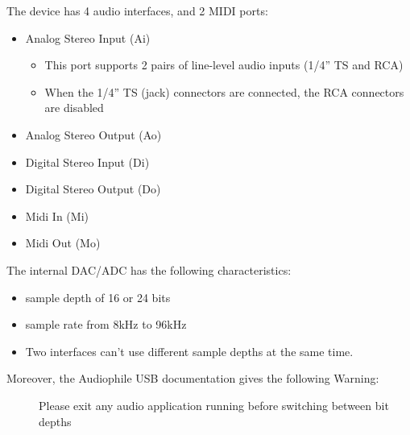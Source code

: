 \documentclass[a4paper,8pt,english]{sphinxmanual}
\begin{document}
The device has 4 audio interfaces, and 2 MIDI ports:
\begin{itemize}
\item {} 
Analog Stereo Input (Ai)
\begin{itemize}
\item {} 
This port supports 2 pairs of line-level audio inputs (1/4'' TS and RCA)

\item {} 
When the 1/4'' TS (jack) connectors are connected, the RCA connectors
are disabled

\end{itemize}

\item {} 
Analog Stereo Output (Ao)

\item {} 
Digital Stereo Input (Di)

\item {} 
Digital Stereo Output (Do)

\item {} 
Midi In (Mi)

\item {} 
Midi Out (Mo)

\end{itemize}

The internal DAC/ADC has the following characteristics:
\begin{itemize}
\item {} 
sample depth of 16 or 24 bits

\item {} 
sample rate from 8kHz to 96kHz

\item {} 
Two interfaces can't use different sample depths at the same time.

\end{itemize}
\begin{description}
\item[{Moreover, the Audiophile USB documentation gives the following Warning:}] \leavevmode
Please exit any audio application running before switching between bit depths

\end{description}
\end{document}
